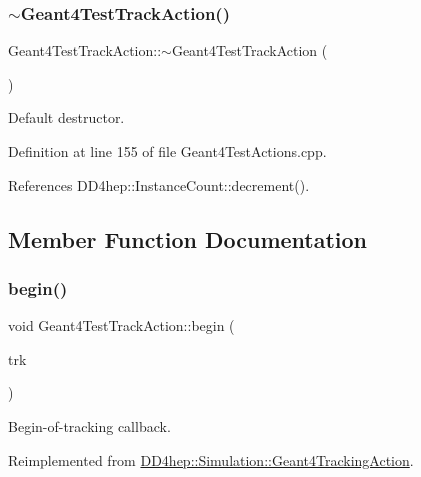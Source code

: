 \subsubsection{\texorpdfstring{$\sim$\+Geant4\+Test\+Track\+Action()}{~Geant4TestTrackAction()}}
{\footnotesize\ttfamily Geant4\+Test\+Track\+Action\+::$\sim$\+Geant4\+Test\+Track\+Action (\begin{DoxyParamCaption}{ }\end{DoxyParamCaption})\hspace{0.3cm}{\ttfamily [virtual]}}



Default destructor. 



Definition at line 155 of file Geant4\+Test\+Actions.\+cpp.



References D\+D4hep\+::\+Instance\+Count\+::decrement().



\subsection{Member Function Documentation}
\hypertarget{class_d_d4hep_1_1_simulation_1_1_test_1_1_geant4_test_track_action_a461ee9be4bf51bcfac397d093fb55fb8}{}\label{class_d_d4hep_1_1_simulation_1_1_test_1_1_geant4_test_track_action_a461ee9be4bf51bcfac397d093fb55fb8} 
\subsubsection{\texorpdfstring{begin()}{begin()}}
{\footnotesize\ttfamily void Geant4\+Test\+Track\+Action\+::begin (\begin{DoxyParamCaption}\item[{const G4\+Track $\ast$}]{trk }\end{DoxyParamCaption})\hspace{0.3cm}{\ttfamily [virtual]}}



Begin-\/of-\/tracking callback. 



Reimplemented from \hyperlink{class_d_d4hep_1_1_simulation_1_1_geant4_tracking_action_a65858867a7b71bf4f48b9f140bc9a88d}{D\+D4hep\+::\+Simulation\+::\+Geant4\+Tracking\+Action}.



